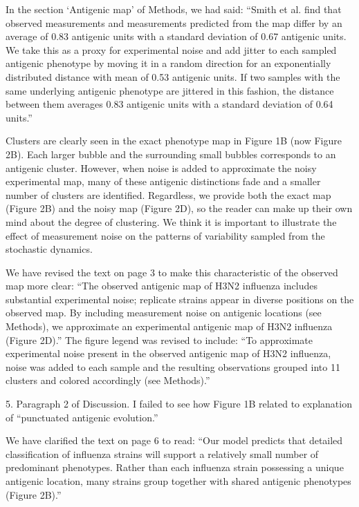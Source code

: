 \documentclass[11pt,oneside,letterpaper]{article}
\def\comment#1{
#1
}
\def\response#1{
\begin{bf}
#1
\end{bf}
}
\def\break{\vspace{0.2cm}}
\begin{document}
\response{In the section `Antigenic map' of Methods, we had said: ``Smith et al. find that observed measurements and measurements predicted from the map differ by an average of 0.83 antigenic units with a standard deviation of 0.67 antigenic units. We take this as a proxy for experimental noise and add jitter to each sampled antigenic phenotype by moving it in a random direction for an exponentially distributed distance with mean of 0.53 antigenic units.  If two samples with the same underlying antigenic phenotype are jittered in this fashion, the distance between them averages 0.83 antigenic units with a standard deviation of 0.64 units.''}

\response{Clusters are clearly seen in the exact phenotype map in Figure 1B (now Figure 2B).  Each larger bubble and the surrounding small bubbles corresponds to an antigenic cluster.  However, when noise is added to approximate the noisy experimental map, many of these antigenic distinctions fade and a smaller number of clusters are identified.  Regardless, we provide both the exact map (Figure 2B) and the noisy map (Figure 2D), so the reader can make up their own mind about the degree of clustering.  We think it is important to illustrate the effect of measurement noise on the patterns of variability sampled from the stochastic dynamics.}

\response{We have revised the text on page 3 to make this characteristic of the observed map more clear: ``The observed antigenic map of H3N2 influenza includes substantial experimental noise; replicate strains appear in diverse positions on the observed map.  By including measurement noise on antigenic locations (see Methods), we approximate an experimental antigenic map of H3N2 influenza (Figure 2D).''  The figure legend was revised to include: ``To approximate experimental noise present in the observed antigenic map of H3N2 influenza, noise was added to each sample and the resulting observations grouped into 11 clusters and colored accordingly (see Methods).''}

\break

\comment{5. Paragraph 2 of Discussion. I failed to see how Figure 1B related to explanation of ``punctuated antigenic evolution.''}

\response{We have clarified the text on page 6 to read: ``Our model predicts that detailed classification of influenza strains will support a relatively small number of predominant phenotypes.  Rather than each influenza strain possessing a unique antigenic location, many strains group together with shared antigenic phenotypes (Figure 2B).''}
\end{document}
